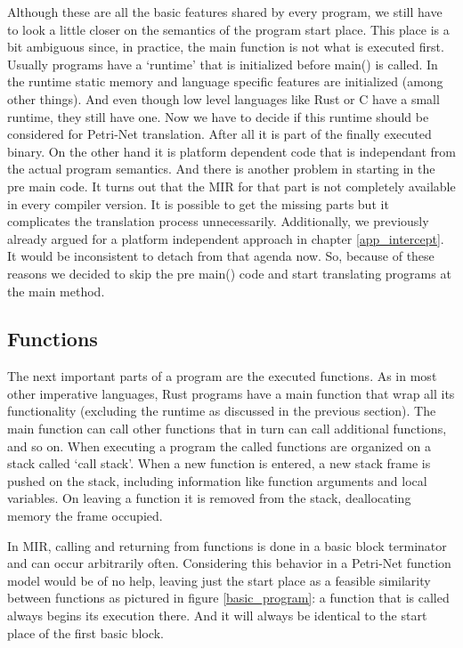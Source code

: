 Although these are all the basic features shared by every program, we still have to look a little closer on the semantics of the program start place.
This place is a bit ambiguous since, in practice, the main function is not what is executed first.
Usually programs have a `runtime' that is initialized before main() is called.
In the runtime  static memory and language specific features are initialized (among other things).
And even though low level languages like Rust or C have a small runtime, they still have one.
Now we have to decide if this runtime should be considered for Petri-Net translation.
After all it is part of the finally executed binary.
On the other hand it is platform dependent code that is independant from the actual program semantics.
And there is another problem in starting in the pre main code.
It turns out that the MIR for that part is not completely available in every compiler version.
It is possible to get the missing parts but it complicates the translation process unnecessarily.
Additionally, we previously already argued for a platform independent approach in chapter \ref{app_intercept}.
It would be inconsistent to detach from that agenda now.
So, because of these reasons we decided to skip the pre main() code and start translating programs at the main method.

\subsection{Functions}
The next important parts of a program are the executed functions.
As in most other imperative languages, Rust programs have a main function that wrap all its functionality (excluding the runtime as discussed in the previous section).
The main function can call other functions that in turn can call additional functions, and so on.
When executing a program the called functions are organized on a stack called `call stack'.
When a new function is entered, a new stack frame is pushed on the stack, including information like function arguments and local variables.
On leaving a function it is removed from the stack, deallocating memory the frame occupied.

In MIR, calling and returning from functions is done in a basic block terminator and can occur arbitrarily often.
Considering this behavior in a Petri-Net function model would be of no help, leaving just the start place as a feasible similarity between functions as pictured in figure \ref{basic_program}:
a function that is called always begins its execution there.
And it will always be identical to the start place of the first basic block.

